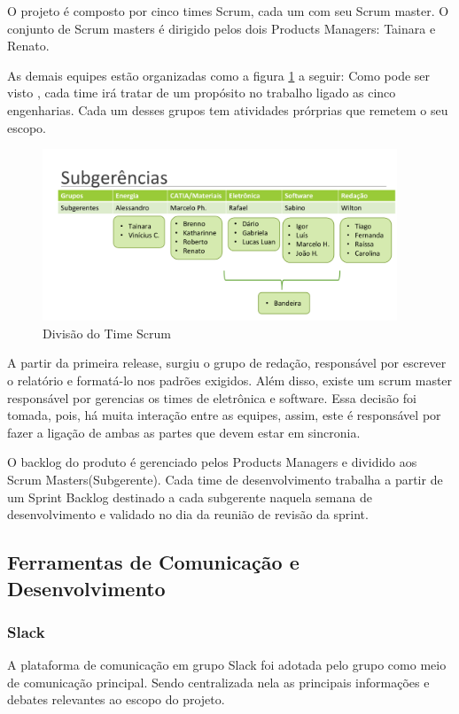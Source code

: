 O projeto é composto por cinco times Scrum, cada um com seu Scrum master. O
conjunto de Scrum masters é dirigido pelos dois Products Managers: Tainara e Renato.

 As demais equipes estão organizadas como a figura  \ref{fig:time} a seguir: Como pode ser visto
, cada time irá tratar de um propósito no trabalho ligado as cinco
engenharias. Cada um desses grupos tem atividades prórprias que remetem o seu escopo.

\begin{figure}[h]
  \centering
  \includegraphics[width=400px, scale=1]{figuras/time}
  \caption{Divisão do Time Scrum}
\label{fig:time}
\end{figure}

A partir da primeira release, surgiu o grupo de redação, responsável por escrever
o relatório e formatá-lo nos padrões exigidos. Além disso, existe um scrum master
responsável por gerencias os times de eletrônica e software. Essa decisão foi
tomada, pois, há muita interação entre as equipes, assim, este é responsável por
fazer a ligação de ambas as partes que devem estar em sincronia.

O backlog do produto é gerenciado pelos Products Managers e dividido aos Scrum
Masters(Subgerente). Cada time de desenvolvimento trabalha a partir de um Sprint Backlog
destinado a cada subgerente naquela semana de desenvolvimento e validado no dia
da reunião de revisão da sprint.

\subsection{Ferramentas de Comunicação e Desenvolvimento}
\subsubsection{Slack}
A plataforma de comunicação em grupo Slack foi adotada pelo grupo como meio de comunicação principal.
Sendo centralizada nela as principais informações e debates relevantes ao escopo do projeto.

